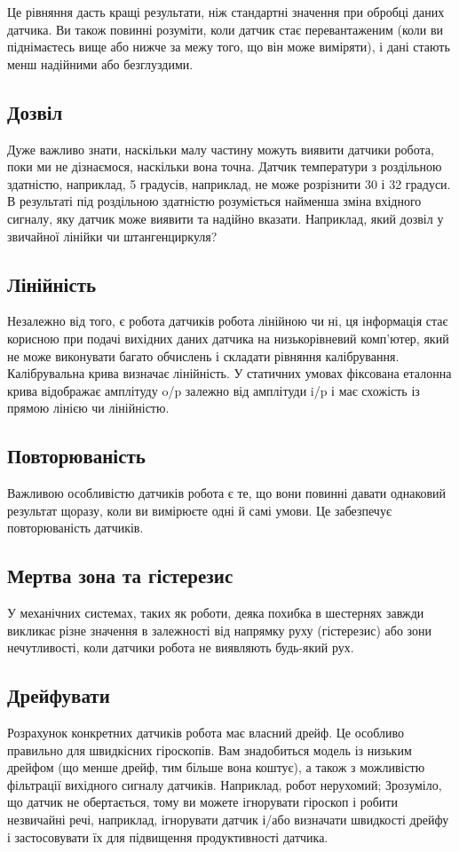 \documentclass[a4paper,14pt]{extreport}
\begin{document}
Це рівняння дасть кращі результати, ніж стандартні значення при обробці даних датчика. Ви також повинні розуміти, коли датчик стає перевантаженим (коли ви піднімаєтесь вище або нижче за межу того, що він може виміряти), і дані стають менш надійними або безглуздими.

\subsection{Дозвіл}
Дуже важливо знати, наскільки малу частину можуть виявити датчики робота, поки ми не дізнаємося, наскільки вона точна. Датчик температури з роздільною здатністю, наприклад, 5 градусів, наприклад, не може розрізнити 30 і 32 градуси. В результаті під роздільною здатністю розуміється найменша зміна вхідного сигналу, яку датчик може виявити та надійно вказати. Наприклад, який дозвіл у звичайної лінійки чи штангенциркуля?

\subsection{Лінійність}
Незалежно від того, є робота датчиків робота лінійною чи ні, ця інформація стає корисною при подачі вихідних даних датчика на низькорівневий комп'ютер, який не може виконувати багато обчислень і складати рівняння калібрування. Калібрувальна крива визначає лінійність. У статичних умовах фіксована еталонна крива відображає амплітуду o/p залежно від амплітуди i/p і має схожість із прямою лінією чи лінійністю.

\subsection{Повторюваність}
Важливою особливістю датчиків робота є те, що вони повинні давати однаковий результат щоразу, коли ви вимірюєте одні й самі умови. Це забезпечує повторюваність датчиків.

\subsection{Мертва зона та гістерезис}
У механічних системах, таких як роботи, деяка похибка в шестернях завжди викликає різне значення в залежності від напрямку руху (гістерезис) або зони нечутливості, коли датчики робота не виявляють будь-який рух.

\subsection{Дрейфувати}
Розрахунок конкретних датчиків робота має власний дрейф. Це особливо правильно для швидкісних гіроскопів. Вам знадобиться модель із низьким дрейфом (що менше дрейф, тим більше вона коштує), а також з можливістю фільтрації вихідного сигналу датчиків. Наприклад, робот нерухомий; Зрозуміло, що датчик не обертається, тому ви можете ігнорувати гіроскоп і робити незвичайні речі, наприклад, ігнорувати датчик і/або визначати швидкості дрейфу і застосовувати їх для підвищення продуктивності датчика.
\end{document}
